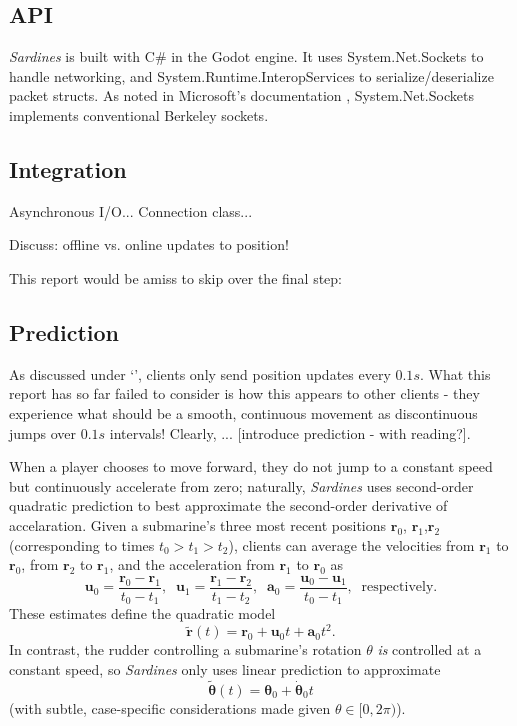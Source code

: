 \documentclass[a4paper, 9pt]{article}
\begin{document}
\begin{flushleft}
\subsection*{API}

\textit{Sardines} is built with C\# in the Godot engine. It uses System.Net.Sockets to handle networking, and System.Runtime.InteropServices to serialize/deserialize packet structs. As noted in Microsoft's documentation \citeyearpar{msftSNS}, System.Net.Sockets implements conventional Berkeley sockets.

\subsection*{Integration}

Asynchronous I/O...
Connection class...

\vspace{5pt}\noindent
Discuss: offline vs. online updates to position!

\vspace{5pt}\noindent
This report would be amiss to skip over the final step: 

\subsection*{Prediction}\label{Prediction}

As discussed under `',  clients only send position updates every $0.1s$. What this report has so far failed to consider is how this appears to other clients - they experience what should be a smooth, continuous movement as discontinuous jumps over $0.1s$ intervals! Clearly, ... [introduce prediction - with reading?].

\vspace{5pt}\noindent
When a player chooses to move forward, they do not jump to a constant speed but continuously accelerate from zero; naturally, \textit{Sardines} uses second-order quadratic prediction to best approximate the second-order derivative of accelaration. Given a submarine's three most recent positions $\mathbf{r}_0$, $\mathbf{r}_1$,$\mathbf{r}_2$ (corresponding to times $t_0 > t_1 > t_2$), clients can average the velocities from $\mathbf{r}_1$ to $\mathbf{r}_0$, from $\mathbf{r}_2$ to $\mathbf{r}_1$, and the acceleration from $\mathbf{r}_1$ to $\mathbf{r}_0$ as
$$\mathbf{u}_0 = \frac{\mathbf{r}_0-\mathbf{r}_1}{t_0-t_1}, \;\; \mathbf{u}_1 = \frac{\mathbf{r}_1-\mathbf{r}_2}{t_1-t_2}, \;\; \mathbf{a}_0 = \frac{\mathbf{u}_0-\mathbf{u}_1}{t_0-t_1}, \;\; \textrm{respectively.}$$
These estimates define the quadratic model
$$ \mathbf{\tilde{r}}(t) = \mathbf{r}_0+\mathbf{u}_0t+\mathbf{a}_0t^2.$$
In contrast, the rudder controlling a submarine's rotation $\theta$ \textit{is} controlled at a constant speed, so \textit{Sardines} only uses linear prediction to approximate
$$\mathbf{\tilde{\theta}}(t) = \mathbf{\theta}_0+\mathbf{\dot{\theta}}_0t$$
(with subtle, case-specific considerations made given $\theta \in [0,2\pi)$).



\end{flushleft}
\end{document}
